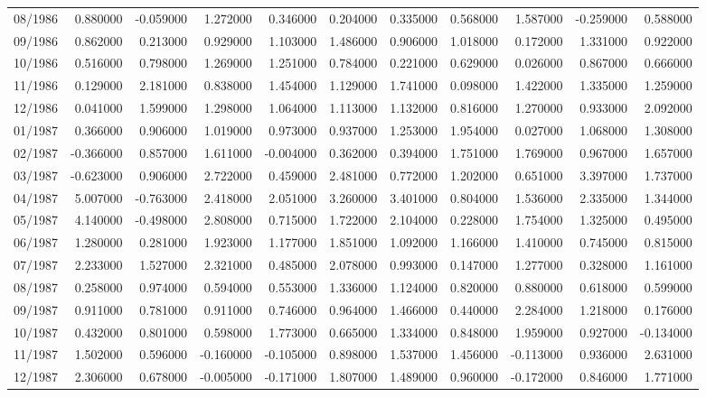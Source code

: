 \begin{tabular}{lrrrrrrrrrr}
08/1986 & 0.880000 & -0.059000 & 1.272000 & 0.346000 & 0.204000 & 0.335000 & 0.568000 & 1.587000 & -0.259000 & 0.588000 \\
09/1986 & 0.862000 & 0.213000 & 0.929000 & 1.103000 & 1.486000 & 0.906000 & 1.018000 & 0.172000 & 1.331000 & 0.922000 \\
10/1986 & 0.516000 & 0.798000 & 1.269000 & 1.251000 & 0.784000 & 0.221000 & 0.629000 & 0.026000 & 0.867000 & 0.666000 \\
11/1986 & 0.129000 & 2.181000 & 0.838000 & 1.454000 & 1.129000 & 1.741000 & 0.098000 & 1.422000 & 1.335000 & 1.259000 \\
12/1986 & 0.041000 & 1.599000 & 1.298000 & 1.064000 & 1.113000 & 1.132000 & 0.816000 & 1.270000 & 0.933000 & 2.092000 \\
01/1987 & 0.366000 & 0.906000 & 1.019000 & 0.973000 & 0.937000 & 1.253000 & 1.954000 & 0.027000 & 1.068000 & 1.308000 \\
02/1987 & -0.366000 & 0.857000 & 1.611000 & -0.004000 & 0.362000 & 0.394000 & 1.751000 & 1.769000 & 0.967000 & 1.657000 \\
03/1987 & -0.623000 & 0.906000 & 2.722000 & 0.459000 & 2.481000 & 0.772000 & 1.202000 & 0.651000 & 3.397000 & 1.737000 \\
04/1987 & 5.007000 & -0.763000 & 2.418000 & 2.051000 & 3.260000 & 3.401000 & 0.804000 & 1.536000 & 2.335000 & 1.344000 \\
05/1987 & 4.140000 & -0.498000 & 2.808000 & 0.715000 & 1.722000 & 2.104000 & 0.228000 & 1.754000 & 1.325000 & 0.495000 \\
06/1987 & 1.280000 & 0.281000 & 1.923000 & 1.177000 & 1.851000 & 1.092000 & 1.166000 & 1.410000 & 0.745000 & 0.815000 \\
07/1987 & 2.233000 & 1.527000 & 2.321000 & 0.485000 & 2.078000 & 0.993000 & 0.147000 & 1.277000 & 0.328000 & 1.161000 \\
08/1987 & 0.258000 & 0.974000 & 0.594000 & 0.553000 & 1.336000 & 1.124000 & 0.820000 & 0.880000 & 0.618000 & 0.599000 \\
09/1987 & 0.911000 & 0.781000 & 0.911000 & 0.746000 & 0.964000 & 1.466000 & 0.440000 & 2.284000 & 1.218000 & 0.176000 \\
10/1987 & 0.432000 & 0.801000 & 0.598000 & 1.773000 & 0.665000 & 1.334000 & 0.848000 & 1.959000 & 0.927000 & -0.134000 \\
11/1987 & 1.502000 & 0.596000 & -0.160000 & -0.105000 & 0.898000 & 1.537000 & 1.456000 & -0.113000 & 0.936000 & 2.631000 \\
12/1987 & 2.306000 & 0.678000 & -0.005000 & -0.171000 & 1.807000 & 1.489000 & 0.960000 & -0.172000 & 0.846000 & 1.771000 \\

\end{tabular}
